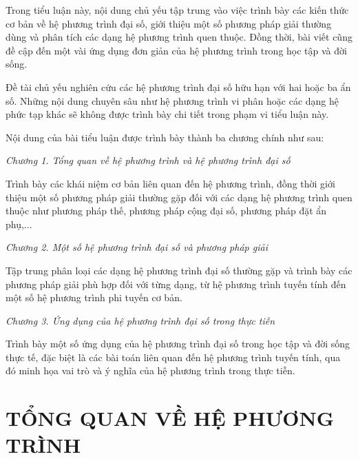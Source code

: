 \documentclass[12pt,a4paper,oneside]{book}
\theoremstyle{theorem}
\theoremstyle{definition}
\begin{document}
Trong tiểu luận này, nội dung chủ yếu tập trung vào việc trình bày các kiến thức cơ bản về hệ phương trình đại số, giới thiệu một số phương pháp giải thường dùng và phân tích các dạng hệ phương trình quen thuộc. Đồng thời, bài viết cũng đề cập đến một vài ứng dụng đơn giản của hệ phương trình trong học tập và đời sống.

Đề tài chủ yếu nghiên cứu các hệ phương trình đại số hữu hạn với hai hoặc ba ẩn số. Những nội dung chuyên sâu như hệ phương trình vi phân hoặc các dạng hệ phức tạp khác sẽ không được trình bày chi tiết trong phạm vi tiểu luận này.

Nội dung của bài tiểu luận được trình bày thành ba chương chính như sau:

\textit{Chương 1. Tổng quan về hệ phương trình và hệ phương trình đại số}

Trình bày các khái niệm cơ bản liên quan đến hệ phương trình, đồng thời giới thiệu một số phương pháp giải thường gặp đối với các dạng hệ phương trình quen thuộc như phương pháp thế, phương pháp cộng đại số, phương pháp đặt ẩn phụ,...

\textit{Chương 2. Một số hệ phương trình đại số và phương pháp giải}

Tập trung phân loại các dạng hệ phương trình đại số thường gặp và trình bày các phương pháp giải phù hợp đối với từng dạng, từ hệ phương trình tuyến tính đến một số hệ phương trình phi tuyến cơ bản.

\textit{Chương 3. Ứng dụng của hệ phương trình đại số trong thực tiễn}

Trình bày một số ứng dụng của hệ phương trình đại số trong học tập và đời sống thực tế, đặc biệt là các bài toán liên quan đến hệ phương trình tuyến tính, qua đó minh họa vai trò và ý nghĩa của hệ phương trình trong thực tiễn.


    \chapter{TỔNG QUAN VỀ HỆ PHƯƠNG TRÌNH}
\end{document}
